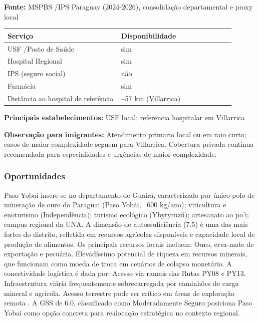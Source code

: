 \textbf{Fonte:} MSPBS /\allowbreak  IPS Paraguay (2024-2026), consolidação
departamental e proxy local

{\def\LTcaptype{none} %
\begin{longtable}{@{}>{\raggedright\arraybackslash}p{0.45\linewidth} >{\raggedright\arraybackslash}p{0.45\linewidth}@{}}
\toprule\noalign{}
Serviço & Disponibilidade \\
\midrule\noalign{}
\endhead
\bottomrule\noalign{}
\endlastfoot
USF /\allowbreak  Posto de Saúde & sim \\
Hospital Regional & sim \\
IPS (seguro social) & não \\
Farmácia & sim \\
Distância ao hospital de referência & \textasciitilde57 km
(Villarrica) \\
\end{longtable}
}

\textbf{Principais estabelecimentos:} USF local; referencia hospitalar
em Villarrica

\textbf{Observação para imigrantes:} Atendimento primario local ou em
raio curto; casos de maior complexidade seguem para Villarrica.
Cobertura privada continua recomendada para especialidades e urgências
de maior complexidade.
\newpage

\subsubsection*{Oportunidades}\label{oport-paso-yobai-0417}
Paso Yobai insere-se no departamento de Guairá, caracterizado por único polo de mineração de ouro do Paraguai (Paso Yobái, ~600 kg/ano); viticultura e enoturismo (Independência); turismo ecológico (Ybytyruzú); artesanato ao po'i; campus regional da UNA. A dimensão de autossuficiência (7.5) é uma das mais fortes do distrito, refletida em recursos agrícolas disponíveis e capacidade local de produção de alimentos. Os principais recursos locais incluem: Ouro, erva-mate de exportação e pecuária. Elevadíssimo potencial de riqueza em recursos minerais, que funcionam como moeda de troca em cenários de colapso monetário. A conectividade logística é dada por: Acesso via ramais das Rutas PY08 e PY13. Infraestrutura viária frequentemente sobrecarregada por caminhões de carga mineral e agrícola. Acesso terrestre pode ser crítico em áreas de exploração remota . A GSS de 6.0, classificado como Moderadamente Seguro posiciona Paso Yobai como opção concreta para realocação estratégica no contexto regional.

